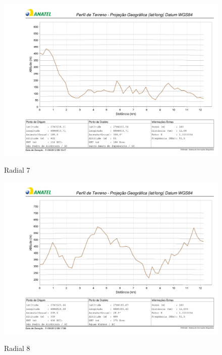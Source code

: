 \begin{figure}[ht] %
\begin{center}
\includegraphics[scale=.5]{./figuras/nmt7_v2.pdf} %

Radial 7
\end{center}
\label{nmt7}
\end{figure}

\begin{figure}[ht] %
\begin{center}
\includegraphics[scale=.5]{./figuras/nmt8_v2.pdf} %

Radial 8
\end{center}
\label{nmt8}
\end{figure}

